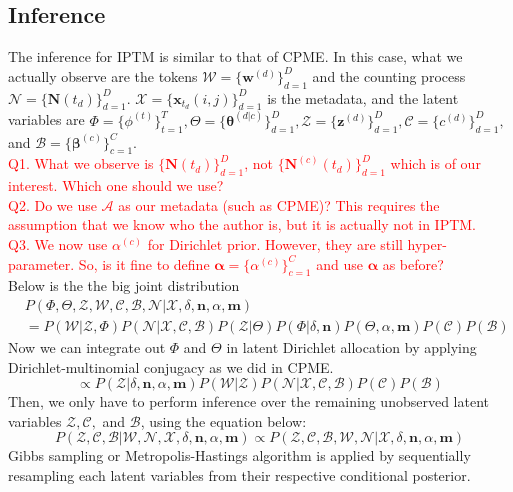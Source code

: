 \documentclass[a4paper]{article}
\begin{document}
\subsection{Inference}
The inference for IPTM is similar to that of CPME. In this case, what we actually observe are the  tokens $\mathcal{W}=\{\boldsymbol{w}^{(d)} \}_{d=1}^{D}$ and the counting process $\mathcal{N}=\{\boldsymbol{N}(t_d) \}_{d=1}^{D}.$ $\mathcal{X}=\{\boldsymbol{x}_{t_d}(i, j)\}_{d=1}^{D}$ is the metadata, and the latent variables are $\Phi=\{\phi^{(t)}\}_{t=1}^{T}, \Theta=\{\boldsymbol{\theta}^{(d|c)} \}_{d=1}^{D}, \mathcal{Z}=\{\boldsymbol{z}^{(d)} \}_{d=1}^{D}, \mathcal{C}=\{{c}^{(d)} \}_{d=1}^{D},$ and $\mathcal{B}=\{\boldsymbol{\beta}^{(c)} \}_{c=1}^{C}$.\\
\newline \textcolor{red}{Q1. What we observe is $\{\boldsymbol{N}(t_d) \}_{d=1}^{D}$, not $\{\boldsymbol{N}^{(c)}(t_d) \}_{d=1}^{D}$ which is of our interest. Which one should we use?\\Q2. Do we use $\mathcal{A}$ as our metadata (such as CPME)? This requires the assumption that we know who the author is, but it is actually not in IPTM.\\
	Q3. We now use $\alpha^{(c)}$ for Dirichlet prior. However, they are still hyper-parameter. So, is it fine to define $\boldsymbol{\alpha}=\{\alpha^{(c)}\}_{c=1}^{C}$ and use $\boldsymbol{\alpha}$ as before?}\\ \newline
Below is the the big joint distribution
\begin{equation}
\begin{aligned}
& P(\Phi, \Theta, \mathcal{Z}, \mathcal{W}, \mathcal{C}, \mathcal{B}, \mathcal{N}| \mathcal{X}, \delta, \boldsymbol{n}, \alpha, \boldsymbol{m}) \\& = P( \mathcal{W}| \mathcal{Z}, \Phi)P(\mathcal{N}|\mathcal{X}, \mathcal{C}, \mathcal{B})P(\mathcal{Z}|\Theta)P(\Phi|\delta, \boldsymbol{n})P(\Theta, \alpha, \boldsymbol{m})P(\mathcal{C})P(\mathcal{B})
\end{aligned}
\end{equation}
Now we can integrate out $\Phi$ and $\Theta$ in latent Dirichlet allocation by applying Dirichlet-multinomial conjugacy as we did in CPME. 
\begin{equation}
\propto P( \mathcal{Z}|\delta, \boldsymbol{n}, \alpha, \boldsymbol{m})P(\mathcal{W}|\mathcal{Z})P(\mathcal{N}|\mathcal{X}, \mathcal{C}, \mathcal{B})P(\mathcal{C})P(\mathcal{B})
\end{equation}
Then, we only have to perform inference over the remaining unobserved latent variables $\mathcal{Z}, \mathcal{C},$ and $\mathcal{B}$, using the equation below:
\begin{equation}
P( \mathcal{Z}, \mathcal{C}, \mathcal{B}|\mathcal{W}, \mathcal{N}, \mathcal{X}, \delta, \boldsymbol{n}, \alpha, \boldsymbol{m}) \propto P(\mathcal{Z}, \mathcal{C}, \mathcal{B}, \mathcal{W}, \mathcal{N} | \mathcal{X}, \delta, \boldsymbol{n}, \alpha, \boldsymbol{m})
\end{equation}
 Gibbs sampling or Metropolis-Hastings algorithm is applied by sequentially resampling each latent variables from their respective conditional posterior.
\end{document}
